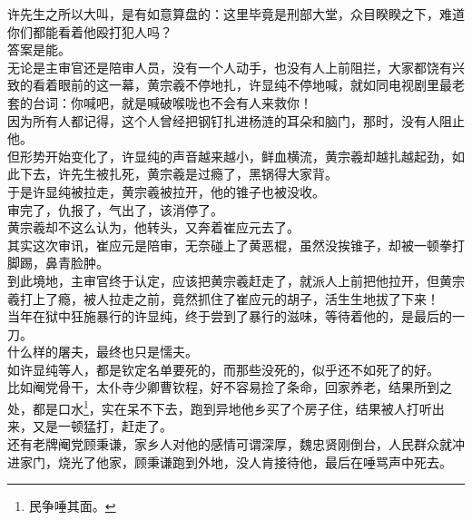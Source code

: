 \begin{multicols}{\theparacolNo}
许先生之所以大叫，是有如意算盘的：这里毕竟是刑部大堂，众目睽睽之下，难道你们都能看着他殴打犯人吗？\\

答案是能。\\

无论是主审官还是陪审人员，没有一个人动手，也没有人上前阻拦，大家都饶有兴致的看着眼前的这一幕，黄宗羲不停地扎，许显纯不停地喊，就如同电视剧里最老套的台词：你喊吧，就是喊破喉咙也不会有人来救你！\\

因为所有人都记得，这个人曾经把钢钉扎进杨涟的耳朵和脑门，那时，没有人阻止他。\\

但形势开始变化了，许显纯的声音越来越小，鲜血横流，黄宗羲却越扎越起劲，如此下去，许先生被扎死，黄宗羲是过瘾了，黑锅得大家背。\\

于是许显纯被拉走，黄宗羲被拉开，他的锥子也被没收。\\

审完了，仇报了，气出了，该消停了。\\

黄宗羲却不这么认为，他转头，又奔着崔应元去了。\\

其实这次审讯，崔应元是陪审，无奈碰上了黄恶棍，虽然没挨锥子，却被一顿拳打脚踢，鼻青脸肿。\\

到此境地，主审官终于认定，应该把黄宗羲赶走了，就派人上前把他拉开，但黄宗羲打上了瘾，被人拉走之前，竟然抓住了崔应元的胡子，活生生地拔了下来！\\

当年在狱中狂施暴行的许显纯，终于尝到了暴行的滋味，等待着他的，是最后的一刀。\\

什么样的屠夫，最终也只是懦夫。\\

如许显纯等人，都是钦定名单要死的，而那些没死的，似乎还不如死了的好。\\

比如阉党骨干，太仆寺少卿曹钦程，好不容易捡了条命，回家养老，结果所到之处，都是口水\footnote{民争唾其面。}，实在呆不下去，跑到异地他乡买了个房子住，结果被人打听出来，又是一顿猛打，赶走了。\\

还有老牌阉党顾秉谦，家乡人对他的感情可谓深厚，魏忠贤刚倒台，人民群众就冲进家门，烧光了他家，顾秉谦跑到外地，没人肯接待他，最后在唾骂声中死去。\\


\end{multicols}
